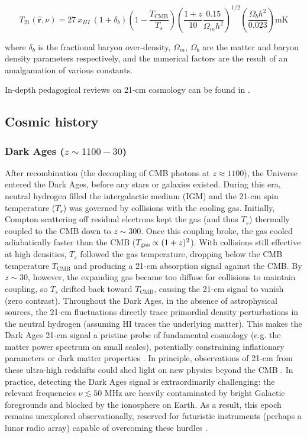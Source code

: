 \documentclass[floats,floatfix,showpacs,amssymb,prd,superscriptaddress,nofootinbib]{revtex4-2} %
\begin{document}
\begin{equation}
    T_{21} (\hat{\textbf{r}}, \nu) = 27 \ x_{HI} \ (1 + \delta_b) \left(1 - \frac{T_{\text{CMB}}}{T_s} \right) \left(\frac{1 + z}{10} \frac{0.15}{\Omega_m h^2} \right)^{1/2} \left( \frac{\Omega_b h^2}{0.023} \right) \text{mK}
    \label{eq:brightness_temperature_approx}
\end{equation}

\noindent where $\delta_b$ is the fractional baryon over-density, $\Omega_m$, $\Omega_b$ are the matter and baryon density parameters respectively, and the numerical factors are the result of an amalgamation of various constants. 

In-depth pedagogical reviews on 21-cm cosmology can be found in \citet{Barkana_Loeb_2001, Furlanetto_2006, Pritchard_Loeb_2012, Barkana_2016, Mesinger_2019, Liu_Shaw_2020}.

\subsection{Cosmic history}
\subsubsection{Dark Ages ($z \sim 1100-30$)}
After recombination (the decoupling of CMB photons at $z \approx 1100$), the Universe entered the Dark Ages, before any stars or galaxies existed. During this era, neutral hydrogen filled the intergalactic medium (IGM) and the 21-cm spin temperature ($T_s$) was governed by collisions with the cooling gas. Initially, Compton scattering off residual electrons kept the gas (and thus $T_s$) thermally coupled to the CMB down to $z\sim300$. Once this coupling broke, the gas cooled adiabatically faster than the CMB (${T_{\rm gas}}\propto(1+z)^2$). With collisions still effective at high densities, $T_s$ followed the gas temperature, dropping below the CMB temperature $T_{\text{CMB}}$ and producing a 21-cm absorption signal against the CMB. By $z\sim30$, however, the expanding gas became too diffuse for collisions to maintain coupling, so $T_s$ drifted back toward $T_{\text{CMB}}$, causing the 21-cm signal to vanish (zero contrast). Throughout the Dark Ages, in the absence of astrophysical sources, the 21-cm fluctuations directly trace primordial density perturbations in the neutral hydrogen (assuming HI traces the underlying matter). This makes the Dark Ages 21-cm signal a pristine probe of fundamental cosmology (e.g. the matter power spectrum on small scales), potentially constraining inflationary parameters or dark matter properties \citep{Loeb_Zaldarriaga_2004}.
In principle, observations of 21-cm from these ultra-high redshifts could shed light on new physics beyond the CMB \citep{Scott_Rees_1990}.
In practice, detecting the Dark Ages signal is extraordinarily challenging: the relevant frequencies $\nu \lesssim 50$ MHz are heavily contaminated by bright Galactic foregrounds and blocked by the ionosphere on Earth. As a result, this epoch remains unexplored observationally, reserved for futuristic instruments (perhaps a lunar radio array) capable of overcoming these hurdles \citep{Tegmark_Zaldarriaga_2009}.
\end{document}
